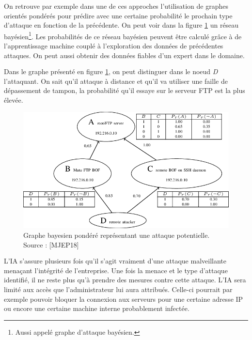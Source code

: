 \documentclass[a4paper, 12pt]{article}
\begin{document}
      On retrouve par exemple dans une de ces approches l’utilisation de graphes
      orientés pondérés pour prédire avec une certaine probabilité le prochain
      type d’attaque en fonction de la précédente. On peut voir dans la figure
      \ref{fig:1} un réseau bayésien\footnote{Aussi appelé graphe d'attaque
      bayésien.}. Les probabilités de ce réseau bayésien peuvent être calculé
      grâce à de l'apprentissage machine couplé à l'exploration des données de
      précédentes attaques. On peut aussi obtenir des données fiables d'un
      expert dans le domaine.

      Dans le graphe présenté en figure \ref{fig:1}, on peut distinguer dans le
      noeud \textit{D} l'attaquant. On sait qu'il attaque à distance et qu'il va
      utiliser une faille de dépassement de tampon, la probabilité qu'il essaye
      sur le serveur FTP est la plus élevée.

      \begin{figure}[h]
        \centering
        \includegraphics[scale=.5]{img/attackgraph.png}
        \caption{Graphe bayesien pondéré représentant une attaque potentielle.
        Source : [MJEP18]}
        \label{fig:1}
      \end{figure}

      L’IA s’assure plusieurs fois qu’il s’agit vraiment d’une attaque
      malveillante menaçant l’intégrité de l’entreprise. Une fois la menace et
      le type d’attaque identifié, il ne reste plus qu’à prendre des mesures
      contre cette attaque. L’IA sera limité aux accès que l’administrateur lui
      aura attribués. Celle-ci pourrait par exemple pouvoir bloquer la connexion
      aux serveurs pour une certaine adresse IP ou encore une certaine machine
      interne probablement infectée.
\end{document}
